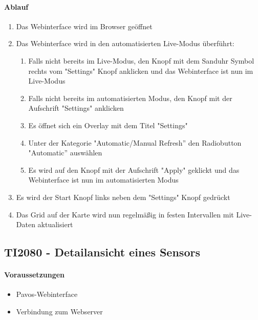 \paragraph{Ablauf}
\begin{enumerate}
\item Das Webinterface wird im Browser geöffnet
\item Das Webinterface wird in den automatisierten Live-Modus überführt:
\begin{enumerate}
\item Falls nicht bereits im Live-Modus, den Knopf mit dem Sanduhr Symbol rechts vom "Settings" Knopf anklicken und das Webinterface ist nun im Live-Modus
\item Falls nicht bereits im automatisierten Modus, den Knopf mit der Aufschrift "Settings" anklicken
\item Es öffnet sich ein Overlay mit dem Titel "Settings"
\item Unter der Kategorie "Automatic/Manual Refresh'' den Radiobutton "Automatic'' auswählen
\item Es wird auf den Knopf mit der Aufschrift "Apply" geklickt und das Webinterface ist nun im automatisierten Modus
\end{enumerate}
\item Es wird der Start Knopf links neben dem "Settings" Knopf gedrückt
\item Das Grid auf der Karte wird nun regelmäßig in festen Intervallen mit Live-Daten aktualisiert
\end{enumerate}
\szenarioGood

\subsection{TI2080 - Detailansicht eines Sensors}
\paragraph{Voraussetzungen}
\begin{itemize}
\item Pavos-Webinterface
\item Verbindung zum Webserver
\end{itemize}
